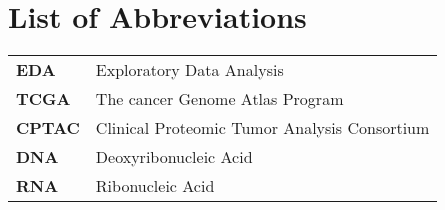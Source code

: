 \section*{List of Abbreviations}

\begin{tabular}{ l l }
  \textbf{EDA} & Exploratory Data Analysis  \\
  \textbf{TCGA} & The cancer Genome Atlas Program  \\
  \textbf{CPTAC} & Clinical Proteomic Tumor Analysis Consortium  \\
  \textbf{DNA} & Deoxyribonucleic Acid  \\
  \textbf{RNA} & Ribonucleic Acid  \\
\end{tabular}